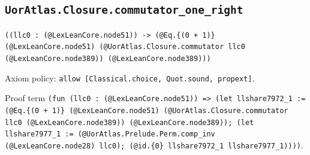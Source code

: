 \documentclass[11pt]{article}
\begin{document}
\subsection*{\texttt{UorAtlas.Closure.commutator\_one\_right}}
\noindent\texttt{((llc0 : (@LexLeanCore.node51)) -> (@Eq.\{(0 + 1)\} (@LexLeanCore.node51) (@UorAtlas.Closure.commutator llc0 (@LexLeanCore.node389)) (@LexLeanCore.node389)))}\par
\noindent Axiom policy: \texttt{allow [Classical.choice, Quot.sound, propext]}.\par
\noindent Proof term \texttt{(fun (llc0 : (@LexLeanCore.node51)) => (let llshare7972\_1 := (@Eq.\{(0 + 1)\} (@LexLeanCore.node51) (@UorAtlas.Closure.commutator llc0 (@LexLeanCore.node389)) (@LexLeanCore.node389)); (let llshare7977\_1 := (@UorAtlas.Prelude.Perm.comp\_inv (@LexLeanCore.node28) llc0); (@id.\{0\} llshare7972\_1 llshare7977\_1))))}.\par
\end{document}
